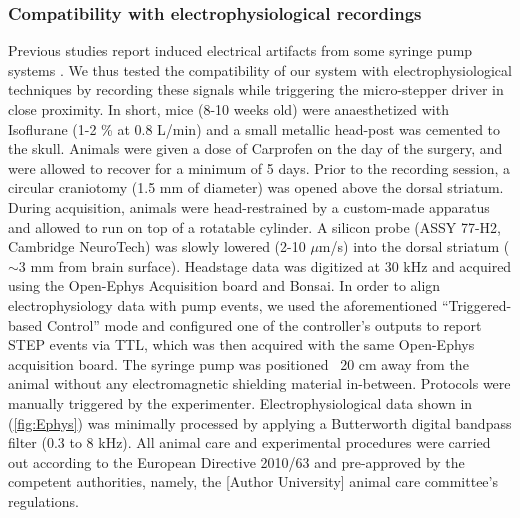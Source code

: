 \subsubsection*{Compatibility with electrophysiological recordings}

Previous studies report induced electrical artifacts from some syringe pump systems \citep{Amarante2019}. We thus tested the compatibility of our system with electrophysiological techniques by recording these signals while triggering the micro-stepper driver in close proximity.
In short, mice (8-10 weeks old) were anaesthetized with Isoflurane (1-2 \% at 0.8 L/min) and a small metallic head-post was cemented to the skull. Animals were given a dose of Carprofen on the day of the surgery, and were allowed to recover for a minimum of 5 days. Prior to the recording session, a circular craniotomy (1.5 mm of diameter) was opened above the dorsal striatum. During acquisition, animals were head-restrained by a custom-made apparatus and allowed to run on top of a rotatable cylinder. A silicon probe (ASSY 77-H2, Cambridge NeuroTech) was slowly lowered (2-10 $\mu$m/s) into the dorsal striatum ($\sim$3 mm from brain surface). Headstage data was digitized at 30 kHz and acquired using the Open-Ephys Acquisition board and Bonsai. In order to align electrophysiology data with pump events, we used the aforementioned “Triggered-based Control” mode and configured one of the controller’s outputs to report STEP events via TTL, which was then acquired with the same Open-Ephys acquisition board. The syringe pump was positioned ~20 cm away from the animal without any electromagnetic shielding material in-between. Protocols were manually triggered by the experimenter.
Electrophysiological data shown in (\cref{fig:Ephys}) was minimally processed by applying a Butterworth digital bandpass filter (0.3 to 8 kHz).
All animal care and experimental procedures were carried out according to the European Directive 2010/63 and pre-approved by the competent authorities, namely, the [Author University] animal care committee’s regulations.




